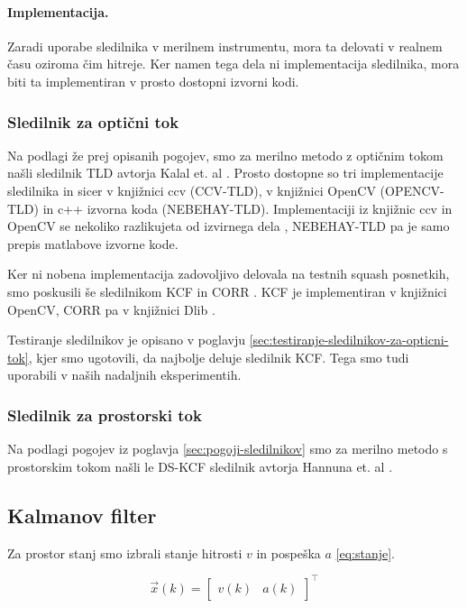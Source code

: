 \paragraph{Implementacija.} Zaradi uporabe sledilnika v merilnem instrumentu, mora ta delovati v realnem času oziroma čim hitreje. Ker namen tega dela ni implementacija sledilnika, mora biti ta implementiran v prosto dostopni izvorni kodi. 


\subsubsection{Sledilnik za optični tok}
Na podlagi že prej opisanih pogojev, smo za merilno metodo z optičnim tokom našli sledilnik TLD avtorja Kalal et. al \cite{kalal2012tracking}. Prosto dostopne so tri implementacije sledilnika in sicer v knjižnici ccv (CCV-TLD), v knjižnici OpenCV (OPENCV-TLD) in c++ izvorna koda (NEBEHAY-TLD). Implementaciji iz knjižnic ccv in OpenCV se nekoliko razlikujeta od izvirnega dela \cite{kalal2012tracking}, NEBEHAY-TLD pa je samo prepis matlabove izvorne kode. 

Ker ni nobena implementacija zadovoljivo delovala na testnih squash posnetkih, smo poskusili še sledilnikom KCF \cite{danelljan2014adaptive} in CORR \cite{danelljan2014accurate}. KCF je implementiran v knjižnici OpenCV, CORR pa v knjižnici Dlib \cite{king2009dlib}.

Testiranje sledilnikov je opisano v poglavju \ref{sec:testiranje-sledilnikov-za-opticni-tok}, kjer smo ugotovili, da najbolje deluje sledilnik KCF. Tega smo tudi uporabili v naših nadaljnih eksperimentih.

\subsubsection{Sledilnik za prostorski tok}
Na podlagi pogojev iz poglavja \ref{sec:pogoji-sledilnikov} smo za merilno metodo s prostorskim tokom našli le DS-KCF sledilnik avtorja Hannuna et. al \cite{hannuna2016ds}. 

\subsection{Kalmanov filter}\label{sec:implementacija-kalman}
Za prostor stanj smo izbrali stanje hitrosti $v$ in pospeška $a$ \eqref{eq:stanje}. 

\begin{equation}
\vec{x}(k) = \begin{bmatrix}
					v(k) & a(k)
				\end{bmatrix}^\top 
                \label{eq:stanje}
\end{equation}

